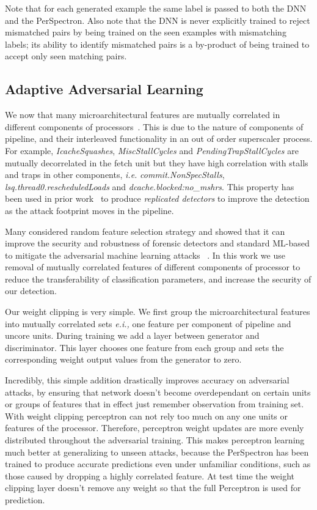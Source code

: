  Note that for each generated example the same label is passed to both the DNN and the PerSpectron. Also note that the DNN is never explicitly trained to reject mismatched pairs by being trained on the seen examples with mismatching labels; its ability to identify mismatched pairs is a by-product of being trained to accept only seen matching pairs. 
 
\subsection{Adaptive Adversarial Learning}

We now that many microarchitectural features are mutually correlated in different components of processors~\cite{PerSpectron}. This is due to the nature of components of pipeline, and their interleaved functionality in an out of order superscaler process. For example, \textit{IcacheSquashes}, \textit{MiscStallCycles} and \textit{PendingTrapStallCycles} 
are mutually decorrelated in the fetch unit but they have high correlation with stalls 
and traps in other components, {\em i.e.} \textit{commit.NonSpecStalls}, 
\textit{lsq.thread0.rescheduledLoads} and \textit{dcache.blocked:no\_mshrs}. This property has been used in prior work~\cite{PerSpectron} to produce {\em replicated detectors} to improve the detection as the attack footprint moves in the pipeline.


Many considered random feature selection
strategy and showed that it can improve the security and robustness of forensic detectors and
standard ML-based to mitigate the adversarial machine learning attacks ~\cite{nowroozi2020survey, secureDetection2019}.
 In this work we use removal of mutually correlated features of different components of processor to reduce the transferability of classification parameters, and increase the security of our 
detection. 

Our weight clipping is very simple. We first group the microarchitectural features into mutually correlated sets {\em e.i.,} one feature per component of pipeline and uncore units. During training we add a layer between generator and discriminator. This layer chooses one feature from each group and sets the corresponding weight output values from the generator to zero.

Incredibly, this simple addition drastically improves accuracy on adversarial attacks, by ensuring that network doesn't become overdependant on certain units or groups of features that in effect just remember observation from training set. With weight clipping perceptron can not rely too much on any one units or features of the processor. Therefore, perceptron weight updates are more evenly distributed throughout the adversarial training. This makes perceptron learning much better at generalizing to unseen attacks, because the PerSpectron has been trained to produce accurate predictions even under unfamiliar conditions, such as those caused by dropping a highly correlated feature. At test time the weight clipping layer doesn't remove any weight so that the full Perceptron is used for prediction. 




